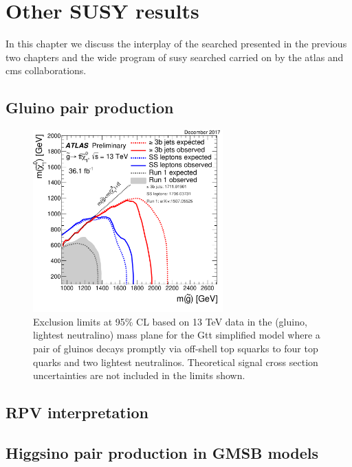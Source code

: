 \chapter{Other SUSY results}
\label{chap:summary_susy}

In this chapter we discuss the interplay of the searched presented in the previous two chapters and the 
wide program of \gls{susy} searched carried on by the \gls{atlas} and \gls{cms} collaborations. 

\section{Gluino pair production}

\begin{figure}[htbp]
	\centering
	\includegraphics[width=0.65\textwidth]{figures/summary_plots/ATLAS_SUSY_Gtt}
	\caption{Exclusion limits at 95\% CL based on 13 TeV data in the (gluino, lightest neutralino) 
	mass plane for the Gtt simplified model where a pair of gluinos decays promptly via off-shell top 
	squarks to four top quarks and two lightest neutralinos. Theoretical signal cross section uncertainties are 
	not included in the limits shown. 
	} 
	\label{fig:summary_atlas_Gtt}
\end{figure}

\section{RPV interpretation}

\FloatBarrier

\section{Higgsino pair production in GMSB models}

